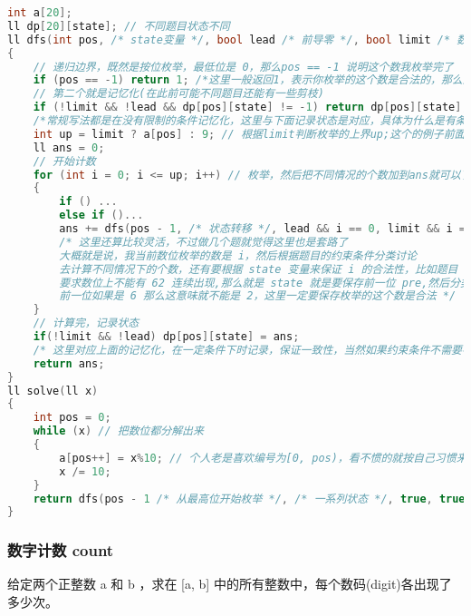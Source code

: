 \begin{lstlisting}[language=C++]
int a[20];
ll dp[20][state]; // 不同题目状态不同
ll dfs(int pos, /* state变量 */, bool lead /* 前导零 */, bool limit /* 数位上界变量 */) // 不是每个题都要判断前导零
{
    // 递归边界，既然是按位枚举，最低位是 0，那么pos == -1 说明这个数我枚举完了
    if (pos == -1) return 1; /*这里一般返回1，表示你枚举的这个数是合法的，那么这里就需要你在枚举时必须每一位都要满足题目条件，也就是说当前枚举到pos位，一定要保证前面已经枚举的数位是合法的。不过具体题目不同或者写法不同的话不一定要返回1 */
    // 第二个就是记忆化(在此前可能不同题目还能有一些剪枝)
    if (!limit && !lead && dp[pos][state] != -1) return dp[pos][state];
    /*常规写法都是在没有限制的条件记忆化，这里与下面记录状态是对应，具体为什么是有条件的记忆化后面会讲*/
    int up = limit ? a[pos] : 9; // 根据limit判断枚举的上界up;这个的例子前面用213讲过了
    ll ans = 0;
    // 开始计数
    for (int i = 0; i <= up; i++) // 枚举，然后把不同情况的个数加到ans就可以了
    {
        if () ...
        else if ()...
        ans += dfs(pos - 1, /* 状态转移 */, lead && i == 0, limit && i == a[pos]) // 最后两个变量传参都是这样写的
        /* 这里还算比较灵活，不过做几个题就觉得这里也是套路了
        大概就是说，我当前数位枚举的数是 i，然后根据题目的约束条件分类讨论
        去计算不同情况下的个数，还有要根据 state 变量来保证 i 的合法性，比如题目
        要求数位上不能有 62 连续出现,那么就是 state 就是要保存前一位 pre,然后分类，
        前一位如果是 6 那么这意味就不能是 2，这里一定要保存枚举的这个数是合法 */
    }
    // 计算完，记录状态
    if(!limit && !lead) dp[pos][state] = ans;
    /* 这里对应上面的记忆化，在一定条件下时记录，保证一致性，当然如果约束条件不需要考虑 lead，这里就是 lead 就完全不用考虑了 */
    return ans;
}
ll solve(ll x)
{
    int pos = 0;
    while (x) // 把数位都分解出来
    {
        a[pos++] = x%10; // 个人老是喜欢编号为[0, pos)，看不惯的就按自己习惯来，反正注意数位边界就行
        x /= 10;
    }
    return dfs(pos - 1 /* 从最高位开始枚举 */, /* 一系列状态 */, true, true); // 刚开始最高位都是有限制并且有前导零的，显然比最高位还要高的一位视为 0 嘛
}
\end{lstlisting}

\subsubsection{数字计数 count}


给定两个正整数 a 和 b ，求在 [a, b] 中的所有整数中，每个数码(digit)各出现了多少次。

